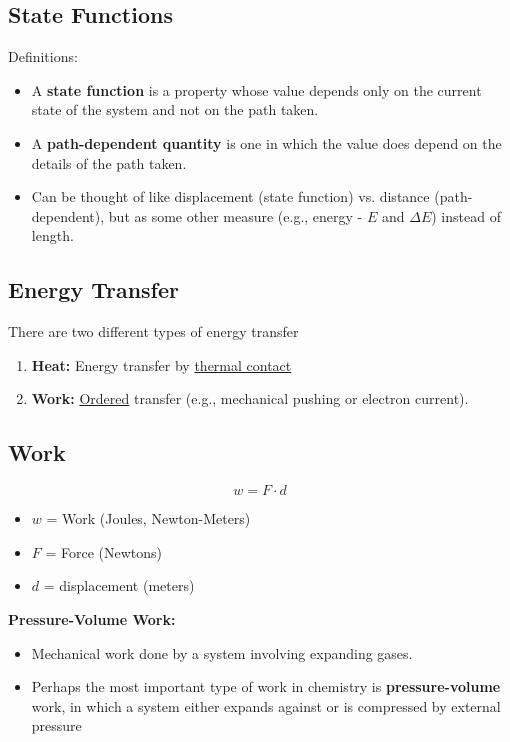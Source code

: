 \documentclass[10pt]{article}
\begin{document}
\subsection*{State Functions}
Definitions:
\begin{itemize}
    \item A \textbf{state function} is a property whose value depends only on the current state of the system and not on the path taken.
    \item A \textbf{path-dependent quantity} is one in which the value does depend on the details of the path taken.
    \item Can be thought of like displacement (state function) vs. distance (path-dependent), but as some other measure (e.g., energy - $E$ and $\Delta E$) instead of length.
\end{itemize}

\subsection*{Energy Transfer}
There are two different types of energy transfer
\begin{enumerate}
    \item \textbf{Heat:} Energy transfer by \underline{thermal contact}
    \item \textbf{Work:} \underline{Ordered} transfer (e.g., mechanical pushing or electron current).
\end{enumerate}

\subsection*{Work}
\[w = F \cdot d\]
\begin{itemize}
    \item $w$ = Work (Joules, Newton-Meters)
    \item $F$ = Force (Newtons)
    \item $d$ = displacement (meters)
\end{itemize}
\textbf{Pressure-Volume Work:}
\begin{itemize}
    \item Mechanical work done by a system involving expanding gases.
    \item Perhaps the most important type of work in chemistry is \textbf{pressure-volume} work, in which a system either expands against or is compressed by external pressure
\end{itemize}
\end{document}
